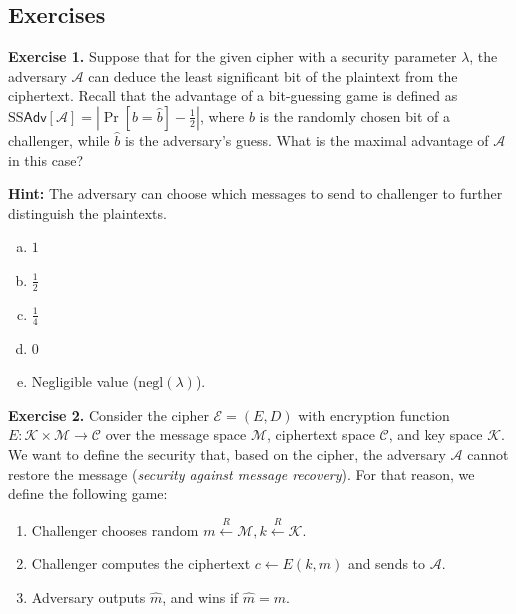 \documentclass[../lecture-notes.tex]{subfiles}
\begin{document}
\newpage
\subsection{Exercises}

\textbf{Exercise 1.} Suppose that for the given cipher with a security parameter $\lambda$, the adversary $\mathcal{A}$ can deduce the least significant bit of the plaintext from the ciphertext. Recall that the advantage 
of a bit-guessing game is defined as $\text{SS}\mathsf{Adv}[\mathcal{A}] = \left|\Pr[b=\hat{b}] - \frac{1}{2}\right|$, where $b$ is the randomly chosen bit of a challenger, while 
$\hat{b}$ is the adversary's guess. What is the maximal advantage of $\mathcal{A}$ in this case?

\textbf{Hint:} The adversary can choose which messages to send to challenger to further distinguish the plaintexts.
\begin{multicols}{3}
    \begin{enumerate}[a)]
        \item $1$
        \item $\frac{1}{2}$
        \item $\frac{1}{4}$
        \item $0$
        \item Negligible value ($\text{negl}(\lambda)$).
    \end{enumerate}
\end{multicols}

\textbf{Exercise 2.} Consider the cipher $\mathcal{E} = (E,D)$ with encryption function $E: \mathcal{K} \times \mathcal{M} \to \mathcal{C}$ over the message space $\mathcal{M}$, ciphertext space $\mathcal{C}$, and key space $\mathcal{K}$. We want to define the security
that, based on the cipher, the adversary $\mathcal{A}$ cannot restore the message (\textit{security against message recovery}). For that reason, we define the following game:
\begin{enumerate}
    \item Challenger chooses random $m \xleftarrow{R} \mathcal{M}, k \xleftarrow{R} \mathcal{K}$.
    \item Challenger computes the ciphertext $c \gets E(k,m)$ and sends to $\mathcal{A}$.
    \item Adversary outputs $\hat{m}$, and wins if $\hat{m} = m$.
\end{enumerate}
\end{document}

